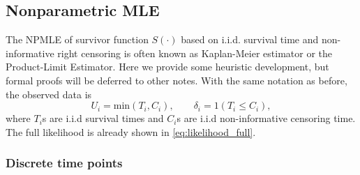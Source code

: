 \documentclass[a4paper,12pt]{article}
\begin{document}
\subsection{Nonparametric MLE}
\label{sec:nonparametric-mle}

The NPMLE of survivor function $S\left(\cdot\right)$ based on i.i.d. survival time and non-informative right censoring is often known as Kaplan-Meier estimator or the Product-Limit Estimator. Here we provide some heuristic development, but formal proofs will be deferred to other notes. With the same notation as before, the observed data is
\[
  U_i = \mathrm{min}\left(T_i, C_i\right),\quad\quad \delta_i = 1\left(T_i \leq C_i\right),
\]
where $T_i$s are i.i.d survival times and $C_i$s are i.i.d {\color{red} non-informative} censoring time. The full likelihood is already shown in \eqref{eq:likelihood_full}.

\subsubsection{Discrete time points}
\label{sec:discrete-time-points}
\end{document}
